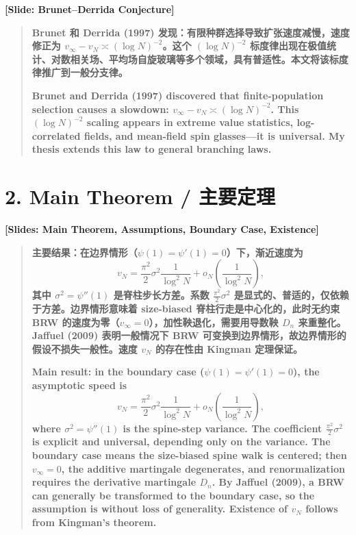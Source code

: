 \documentclass[12pt,a4paper]{article}
\begin{document}
\begin{center}
\color{blue!60!black}\textbf{[Slide: Brunet--Derrida Conjecture]}
\end{center}

\begin{quote}
\textbf{Brunet 和 Derrida (1997) 发现：有限种群选择导致扩张速度减慢，速度修正为 $v_\infty-v_N\asymp(\log N)^{-2}$。这个 $(\log N)^{-2}$ 标度律出现在极值统计、对数相关场、平均场自旋玻璃等多个领域，具有普适性。本文将该标度律推广到一般分支律。}

\bigskip

\textbf{Brunet and Derrida (1997) discovered that finite-population selection causes a slowdown: $v_\infty-v_N\asymp(\log N)^{-2}$. This $(\log N)^{-2}$ scaling appears in extreme value statistics, log-correlated fields, and mean-field spin glasses---it is universal. My thesis extends this law to general branching laws.}
\end{quote}

\section*{2. Main Theorem / 主要定理}

\begin{center}
\color{blue!60!black}\textbf{[Slides: Main Theorem, Assumptions, Boundary Case, Existence]}
\end{center}

\begin{quote}
\textbf{主要结果：在边界情形（$\psi(1)=\psi'(1)=0$）下，渐近速度为}
\[
v_N = \frac{\pi^2}{2}\sigma^2\frac{1}{\log^2 N} + o_N\!\left(\frac{1}{\log^2 N}\right),
\]
\textbf{其中 $\sigma^2=\psi''(1)$ 是脊柱步长方差。系数 $\frac{\pi^2}{2}\sigma^2$ 是显式的、普适的，仅依赖于方差。边界情形意味着 size-biased 脊柱行走是中心化的，此时无约束 BRW 的速度为零（$v_\infty=0$），加性鞅退化，需要用导数鞅 $D_n$ 来重整化。Jaffuel (2009) 表明一般情况下 BRW 可变换到边界情形，故边界情形的假设不损失一般性。速度 $v_N$ 的存在性由 Kingman 定理保证。}

\bigskip

\textbf{Main result: in the boundary case ($\psi(1)=\psi'(1)=0$), the asymptotic speed is}
\[
v_N = \frac{\pi^2}{2}\sigma^2\frac{1}{\log^2 N} + o_N\!\left(\frac{1}{\log^2 N}\right),
\]
\textbf{where $\sigma^2=\psi''(1)$ is the spine-step variance. The coefficient $\frac{\pi^2}{2}\sigma^2$ is explicit and universal, depending only on the variance. The boundary case means the size-biased spine walk is centered; then $v_\infty=0$, the additive martingale degenerates, and renormalization requires the derivative martingale $D_n$. By Jaffuel (2009), a BRW can generally be transformed to the boundary case, so the assumption is without loss of generality. Existence of $v_N$ follows from Kingman's theorem.}
\end{quote}
\end{document}
